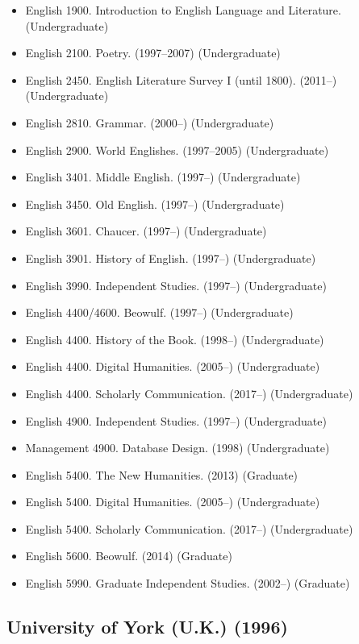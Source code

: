 \documentclass[12pt]{article}
\begin{document}
\begin{itemize}
  \item English 1900. Introduction to English Language and Literature. (Undergraduate)
  \item English 2100. Poetry. (1997–2007) (Undergraduate)
  \item English 2450. English Literature Survey I (until 1800). (2011–) (Undergraduate)
  \item English 2810. Grammar. (2000–) (Undergraduate)
  \item English 2900. World Englishes. (1997–2005) (Undergraduate)
  \item English 3401. Middle English. (1997–) (Undergraduate)
  \item English 3450. Old English. (1997–) (Undergraduate)
  \item English 3601. Chaucer. (1997–) (Undergraduate)
  \item English 3901. History of English. (1997–) (Undergraduate)
  \item English 3990. Independent Studies. (1997–) (Undergraduate)
  \item English 4400/4600. Beowulf. (1997–) (Undergraduate)
  \item English 4400. History of the Book. (1998–) (Undergraduate)
  \item English 4400. Digital Humanities. (2005–) (Undergraduate)
  \item English 4400. Scholarly Communication. (2017–) (Undergraduate)
  \item English 4900. Independent Studies. (1997–) (Undergraduate)
  \item Management 4900. Database Design. (1998) (Undergraduate)
  \item English 5400. The New Humanities. (2013) (Graduate)
  \item English 5400. Digital Humanities. (2005–) (Undergraduate)
  \item English 5400. Scholarly Communication. (2017–) (Undergraduate)
  \item English 5600. Beowulf. (2014) (Graduate)
  \item English 5990. Graduate Independent Studies. (2002–) (Graduate)
\end{itemize}


\subsection*{University of York (U.K.) (1996)}
\end{document}
